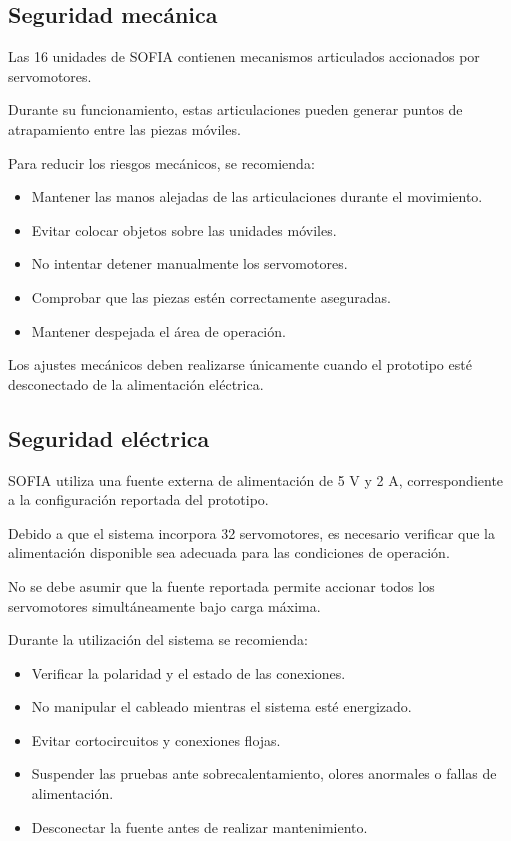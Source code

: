 \documentclass[letterpaper,journal]{IEEEtran}
\begin{document}
\subsection{Seguridad mecánica}

Las 16 unidades de SOFIA contienen
mecanismos articulados accionados
por servomotores.

Durante su funcionamiento, estas
articulaciones pueden generar puntos
de atrapamiento entre las piezas móviles.

Para reducir los riesgos mecánicos,
se recomienda:

\begin{itemize}
    \item Mantener las manos alejadas
    de las articulaciones durante
    el movimiento.

    \item Evitar colocar objetos
    sobre las unidades móviles.

    \item No intentar detener
    manualmente los servomotores.

    \item Comprobar que las piezas
    estén correctamente aseguradas.

    \item Mantener despejada
    el área de operación.
\end{itemize}

Los ajustes mecánicos deben realizarse
únicamente cuando el prototipo esté
desconectado de la alimentación eléctrica.

\subsection{Seguridad eléctrica}

SOFIA utiliza una fuente externa
de alimentación de 5 V y 2 A,
correspondiente a la configuración
reportada del prototipo.

Debido a que el sistema incorpora
32 servomotores, es necesario
verificar que la alimentación
disponible sea adecuada para
las condiciones de operación.

No se debe asumir que la fuente
reportada permite accionar todos
los servomotores simultáneamente
bajo carga máxima.

Durante la utilización del sistema
se recomienda:

\begin{itemize}
    \item Verificar la polaridad
    y el estado de las conexiones.

    \item No manipular el cableado
    mientras el sistema esté
    energizado.

    \item Evitar cortocircuitos
    y conexiones flojas.

    \item Suspender las pruebas
    ante sobrecalentamiento,
    olores anormales o fallas
    de alimentación.

    \item Desconectar la fuente
    antes de realizar mantenimiento.
\end{itemize}
\end{document}
